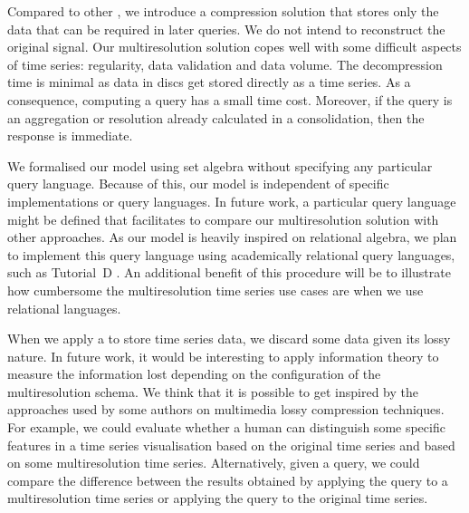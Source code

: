 Compared to other , we introduce a compression solution
that stores only the data that can be required in later queries. We do
not intend to reconstruct the original signal. Our multiresolution
solution copes well with some difficult aspects of time series:
regularity, data validation and data volume.  The decompression time
is minimal as data in discs get stored directly as a time series. As a
consequence, computing a query has a small time cost. Moreover, if the
query is an aggregation or resolution already calculated in a
 consolidation, then the response is immediate.


We formalised our model using set algebra without specifying any
particular query language. Because of this, our model is independent
of specific implementations or query languages.  In future work, a
particular query language might be defined that facilitates to compare
our multiresolution solution with other approaches. As our model is
heavily inspired on relational algebra, we plan to implement this
query language using academically relational query languages, such as
Tutorial~D \cite{date:introduction}.  An additional benefit of this
procedure will be to illustrate how cumbersome the multiresolution
time series use cases are when we use relational languages.


When we apply a  to store time series data, we discard
some data given its lossy nature.  In future work, it would be
interesting to apply information theory to measure the information
lost depending on the configuration of the multiresolution schema. We
think that it is possible to get inspired by the approaches used by
some authors on multimedia lossy compression techniques. For example,
we could evaluate whether a human can distinguish some specific
features in a time series visualisation based on the original time
series and based on some multiresolution time series. Alternatively,
given a query, we could compare the difference between the results
obtained by applying the query to a multiresolution time series or
applying the query to the original time series.




